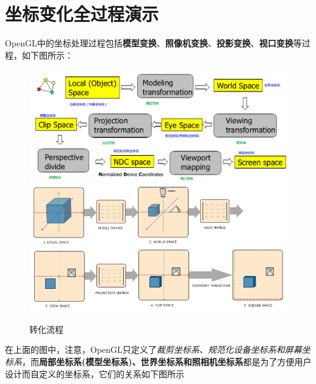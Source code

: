 \documentclass[UTF8,a4paper,12pt]{ctexbook}
\begin{document}
	
	\newpage
	\section{坐标变化全过程演示}
		OpenGL中的坐标处理过程包括\textbf{模型变换}、\textbf{照像机变换}、\textbf{投影变换}、\textbf{视口变换}等过程，如下图所示：
		
		\begin{figure}[H]
			\centering
			\includegraphics[width=.95\linewidth]{transferAll.png}
			\includegraphics[width=.93\linewidth]{transferAll3.png}
			\caption{转化流程}
		\end{figure}
		
		在上面的图中，注意，OpenGL只定义了\textit{裁剪坐标系、规范化设备坐标系和屏幕坐标系}，而\textbf{局部坐标系(模型坐标系)、世界坐标系和照相机坐标系}都是为了方便用户设计而自定义的坐标系，它们的关系如下图所示
		
\end{document}
